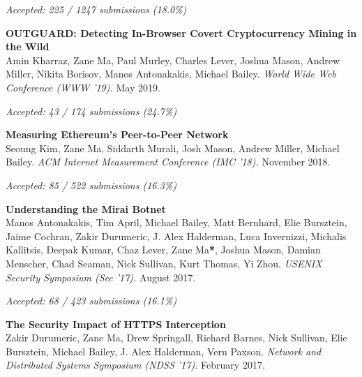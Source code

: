 \documentclass[10pt]{article} %
\begin{document}
{\begin{minipage}[t]{0.5\textwidth}

\vspace{4pt}
{\raggedleft\textit{Accepted: 225 / 1247 submissions (18.0\%)}\par}

\textbf{OUTGUARD: Detecting In-Browser Covert Cryptocurrency Mining in the Wild}\\
Amin Kharraz, Zane Ma, Paul Murley, Charles Lever, Joshua Mason, Andrew Miller,
Nikita Borisov, Manos Antonakakis, Michael Bailey. 
\textit{World Wide Web Conference (WWW '19).} May 2019.


{\raggedleft\textit{Accepted: 43 / 174 submissions (24.7\%)}\par}

\textbf{Measuring Ethereum's Peer-to-Peer Network}\\
Seoung Kim, Zane Ma, Siddarth Murali, Josh Mason, Andrew Miller, Michael Bailey.
\textit{ACM Internet Measurement Conference (IMC '18).} November 2018.


\vspace{6pt}
{\raggedleft\textit{Accepted: 85 / 522 submissions (16.3\%)}\par}

\textbf{Understanding the Mirai Botnet}\\
Manos Antonakakis, Tim April, Michael Bailey, Matt Bernhard, Elie Bursztein, Jaime Cochran, Zakir Durumeric, J. Alex Halderman, Luca Invernizzi, Michalis Kallitsis, Deepak Kumar, Chaz Lever, Zane Ma\textbf{*}, Joshua Mason, Damian Menscher, Chad Seaman, Nick Sullivan, Kurt Thomas, Yi Zhou.
\textit{USENIX Security Symposium (Sec '17).} August 2017.


\vspace{6pt}
{\raggedleft\textit{Accepted: 68 / 423 submissions (16.1\%)}\par}

\textbf{The Security Impact of HTTPS Interception}\\
Zakir Durumeric, Zane Ma, Drew Springall, Richard Barnes, Nick Sullivan, Elie Bursztein, Michael
Bailey, J. Alex Halderman, Vern Paxson.
\textit{Network and Distributed Systems Symposium (NDSS '17).} February 2017.



\end{minipage}}
\end{document}

